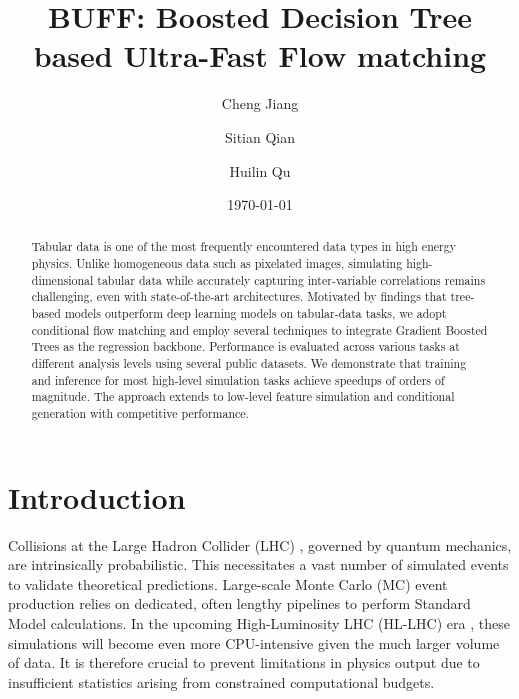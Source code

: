 \documentclass[%
 reprint,
 amsmath,amssymb,
 aps,
prd,
floatfix,
]{revtex4-2}
\begin{document}
\title{BUFF: Boosted Decision Tree based Ultra-Fast Flow matching}%

\author{Cheng Jiang}
\author{Sitian Qian}%
%

\author{Huilin Qu}



\date{\today}%



\begin{abstract}
    Tabular data is one of the most frequently encountered data types in high energy physics. Unlike homogeneous data such as pixelated images, simulating high-dimensional tabular data while accurately capturing inter-variable correlations remains challenging, even with state-of-the-art architectures. Motivated by findings that tree-based models outperform deep learning models on tabular-data tasks, we adopt conditional flow matching and employ several techniques to integrate Gradient Boosted Trees as the regression backbone. Performance is evaluated across various tasks at different analysis levels using several public datasets. We demonstrate that training and inference for most high-level simulation tasks achieve speedups of orders of magnitude. The approach extends to low-level feature simulation and conditional generation with competitive performance.

\end{abstract}



\maketitle




\section{Introduction}\label{sec1}

Collisions at the Large Hadron Collider (LHC) \cite{lhc}, governed by quantum mechanics, are intrinsically probabilistic. This necessitates a vast number of simulated events to validate theoretical predictions. Large-scale Monte Carlo (MC) event production \cite{mc} relies on dedicated, often lengthy pipelines to perform Standard Model calculations. In the upcoming High-Luminosity LHC (HL-LHC) era \cite{hilhc}, these simulations will become even more CPU-intensive \cite{mcchallenge} given the much larger volume of data. It is therefore crucial to prevent limitations in physics output due to insufficient statistics arising from constrained computational budgets.
\end{document}

